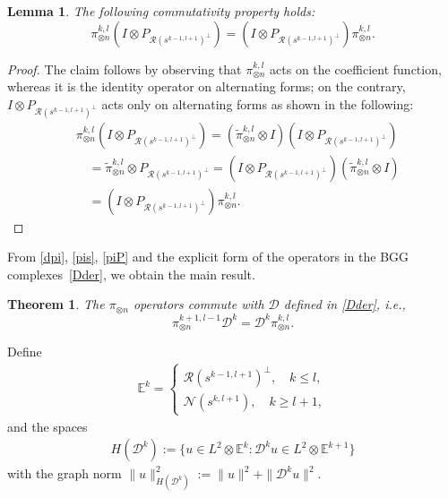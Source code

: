 \documentclass[final]{amsart}%
\newtheorem{theorem}{Theorem}
\newtheorem{lemma}{Lemma}
\newcommand{\0}{\mathaccent23}
\renewcommand\ker{\mathcal{N}}
\newcommand\ran{\mathcal{R}}
\begin{document}
\begin{lemma}
\label{lem:commut-pi-d3}
The following commutativity property holds:
\begin{equation}\label{piP}
\pi^{k, l}_{\otimes n} (I\otimes P_{\ran(s^{k-1, l+1})^{\perp}})= (I\otimes P_{\ran(s^{k-1, l+1})^{\perp}})\pi^{k, l}_{\otimes n}.
\end{equation}
\end{lemma}

\begin{proof}
The claim follows by observing that $\pi^{k, l}_{\otimes n}$ acts on the coefficient function, whereas it is the identity operator on alternating forms; on the contrary, $I\otimes P_{\ran(s^{k-1, l+1})^{\perp}}$ acts only on alternating forms as shown in the following:
\begin{align*}
    &\pi^{k, l}_{\otimes n} \left(I\otimes P_{\ran(s^{k-1, l+1})^{\perp}}\right)
    = \left(\tilde\pi^{k, l}_{\otimes n}\otimes I\right)
    \left(I\otimes P_{\ran(s^{k-1, l+1})^{\perp}}\right)\\ 
    &\quad = \tilde\pi^{k, l}_{\otimes n} \otimes P_{\ran(s^{k-1, l+1})^{\perp}} 
    =\left(I\otimes P_{\ran(s^{k-1, l+1})^{\perp}}\right)
    \left(\tilde\pi^{k, l}_{\otimes n}\otimes I\right)\\
    &\quad = \left(I\otimes P_{\ran(s^{k-1, l+1})^{\perp}}\right)\pi^{k, l}_{\otimes n}.
\end{align*}
\end{proof}

From \eqref{dpi}, \eqref{pis}, \eqref{piP} and the explicit form of the operators in the BGG complexes~\eqref{Dder}, we obtain the main result.
\begin{theorem}
The $\pi_{\otimes n}$ operators commute with $\mathscr{D}$ defined in \eqref{Dder}, i.e., $$
\pi_{\otimes n}^{k+1, l-1}\mathscr{D}^k=\mathscr{D}^k \pi_{\otimes n}^{k, l}.$$
\end{theorem}

Define
\begin{gather*}
    \mathbb{E}^{k}=
    \begin{cases}
    \ran(s^{k-1, l+1})^\perp,\quad k\leq l, \\
    \ker(s^{k, l+1}),\quad k\geq l+1, 
    \end{cases}
\end{gather*}
and the spaces
\begin{gather}
    H(\mathscr{D}^k):=\{u\in L^2\otimes \mathbb{E}^k: \mathscr{D}^k u\in L^2\otimes \mathbb{E}^{k+1}\}
\end{gather}
with the graph norm $\|u\|_{H(\mathscr{D}^k)}^2:=\|u\|^2+\|\mathscr{D}^k u\|^2$.
\end{document}
